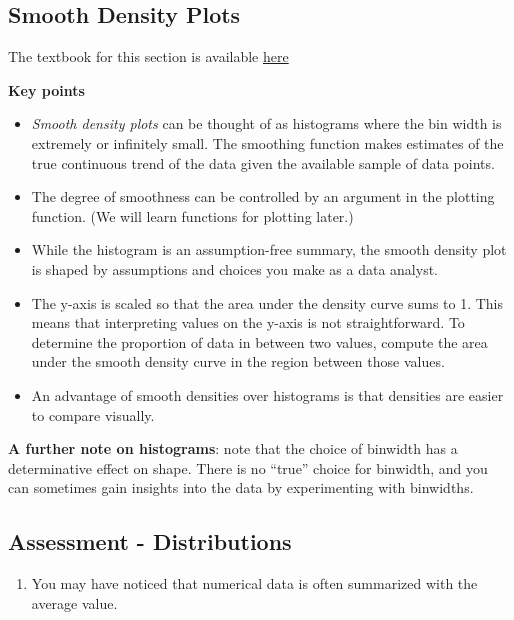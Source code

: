 \documentclass[
]{article}
\providecommand{\tightlist}{%
  \setlength{\itemsep}{0pt}\setlength{\parskip}{0pt}}
\begin{document}
\hypertarget{smooth-density-plots}{%
\subsection{Smooth Density Plots}\label{smooth-density-plots}}

The textbook for this section is available
\href{https://rafalab.github.io/dsbook/distributions.html\#smoothed-density}{here}

\textbf{Key points}

\begin{itemize}
\tightlist
\item
  \emph{Smooth density plots} can be thought of as histograms where the
  bin width is extremely or infinitely small. The smoothing function
  makes estimates of the true continuous trend of the data given the
  available sample of data points.
\item
  The degree of smoothness can be controlled by an argument in the
  plotting function. (We will learn functions for plotting later.)
\item
  While the histogram is an assumption-free summary, the smooth density
  plot is shaped by assumptions and choices you make as a data analyst.
\item
  The y-axis is scaled so that the area under the density curve sums to
  1. This means that interpreting values on the y-axis is not
  straightforward. To determine the proportion of data in between two
  values, compute the area under the smooth density curve in the region
  between those values.
\item
  An advantage of smooth densities over histograms is that densities are
  easier to compare visually.
\end{itemize}

\textbf{A further note on histograms}: note that the choice of binwidth
has a determinative effect on shape. There is no ``true'' choice for
binwidth, and you can sometimes gain insights into the data by
experimenting with binwidths.

\hypertarget{assessment---distributions}{%
\subsection{Assessment -
Distributions}\label{assessment---distributions}}

\begin{enumerate}
\def\labelenumi{\arabic{enumi}.}
\tightlist
\item
  You may have noticed that numerical data is often summarized with the
  average value.
\end{enumerate}
\end{document}
